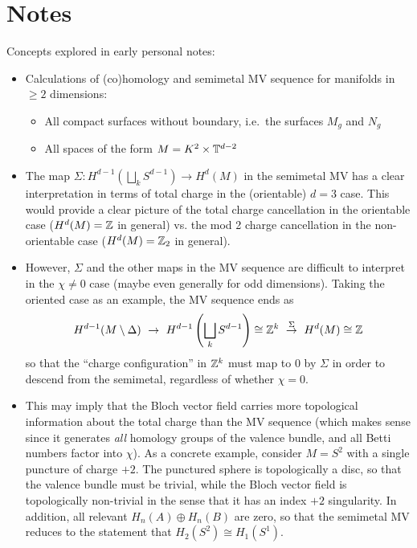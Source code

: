 {\color{red}
\section*{Notes}
Concepts explored in early personal notes:
\begin{itemize}
	\item Calculations of (co)homology and semimetal MV sequence for manifolds in $\geq2$ dimensions:
	\begin{itemize}
		\item All compact surfaces without boundary, i.e.\ the surfaces $M_g$ and $N_g$
		
		\item All spaces of the form $M = K^2 \times \mathbb{T}^{d-2}$
	\end{itemize}
	
	\item The map $\Sigma:H^{d-1}(\bigsqcup_{k}S^{d-1})\to H^d(M)$ in the semimetal MV has a clear interpretation in terms of total charge in the (orientable) $d=3$ case. This would provide a clear picture of the total charge cancellation in the orientable case ($H^d(M) = \mathbb{Z}$ in general) vs. the mod 2 charge cancellation in the non-orientable case ($H^d(M) = \mathbb{Z}_2$ in general).
	
	\item However, $\Sigma$ and the other maps in the MV sequence are difficult to interpret in the $\chi\neq 0$ case (maybe even generally for odd dimensions). Taking the oriented case as an example, the MV sequence ends as
	\begin{align*}
		H^{d-1}(M\setminus\Delta)\ \rightarrow\ H^{d-1}\left(\bigsqcup_{k}S^{d-1}\right) \cong \Z^k\ \overset{\Sigma}{\rightarrow}\ H^d(M) \cong \Z
	\end{align*}
	so that the ``charge configuration'' in $\mathbb{Z}^k$ must map to 0 by $\Sigma$ in order to descend from the semimetal, regardless of whether $\chi=0$.
	
	\item This may imply that the Bloch vector field carries more topological information about the total charge than the MV sequence (which makes sense since it generates \emph{all} homology groups of the valence bundle, and all Betti numbers factor into $\chi$). As a concrete example, consider $M=S^2$ with a single puncture of charge $+2$. The punctured sphere is topologically a disc, so that the valence bundle must be trivial, while the Bloch vector field is topologically non-trivial in the sense that it has an index $+2$ singularity. In addition, all relevant $H_n(A)\oplus H_n(B)$ are zero, so that the semimetal MV reduces to the statement that $H_2(S^2)\cong H_1(S^1)$.
	

\end{itemize}}
